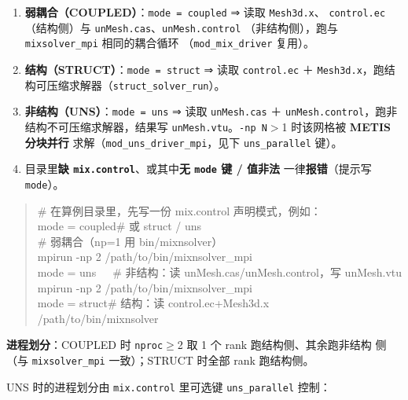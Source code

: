 \documentclass[11pt,a4paper]{ctexart}
\begin{document}
\begin{enumerate}\itemsep2pt
  \item \textbf{弱耦合（COUPLED）}：\texttt{mode = coupled} ⇒ 读取 \texttt{Mesh3d.x}、
        \texttt{control.ec}（结构侧）与 \texttt{unMesh.cas}、\texttt{unMesh.control}
        （非结构侧），跑与 \texttt{mixsolver\_mpi} 相同的耦合循环
        （\texttt{mod\_mix\_driver} 复用）。
  \item \textbf{结构（STRUCT）}：\texttt{mode = struct} ⇒ 读取 \texttt{control.ec} ＋
        \texttt{Mesh3d.x}，跑结构可压缩求解器（\texttt{struct\_solver\_run}）。
  \item \textbf{非结构（UNS）}：\texttt{mode = uns} ⇒ 读取 \texttt{unMesh.cas} ＋
        \texttt{unMesh.control}，跑非结构不可压缩求解器，结果写
        \texttt{unMesh.vtu}。\texttt{-np N}$>$1 时该网格被 \textbf{METIS 分块并行}
        求解（\texttt{mod\_uns\_driver\_mpi}，见下 \texttt{uns\_parallel} 键）。
  \item 目录里\textbf{缺 \texttt{mix.control}}、或其中\textbf{无 \texttt{mode} 键 / 值非法}
        一律\textbf{报错}（提示写 \texttt{mode}）。
\end{enumerate}

\begin{quote}\ttfamily\small
\# 在算例目录里，先写一份 mix.control 声明模式，例如：\\
mode = coupled\qquad\# 或 struct / uns\\
\hspace*{1em}\# 弱耦合（np=1 用 bin/mixnsolver）\\
mpirun -np 2 /path/to/bin/mixnsolver\_mpi\\
\medskip
mode = uns\qquad\ \ \ \# 非结构：读 unMesh.cas/unMesh.control，写 unMesh.vtu\\
mpirun -np 2 /path/to/bin/mixnsolver\_mpi\\
\medskip
mode = struct\qquad\# 结构：读 control.ec+Mesh3d.x\\
/path/to/bin/mixnsolver
\end{quote}

\textbf{进程划分}：COUPLED 时 \texttt{nproc}$\ge$2 取 1 个 rank 跑结构侧、其余跑非结构
侧（与 \texttt{mixsolver\_mpi} 一致）；STRUCT 时全部 rank 跑结构侧。

UNS 时的进程划分由 \texttt{mix.control} 里可选键 \texttt{uns\_parallel} 控制：
\end{document}
